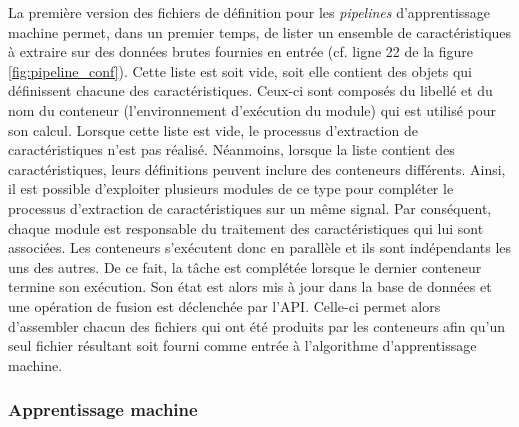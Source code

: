 La première version des fichiers de définition pour les \textit{pipelines} d'apprentissage machine permet, dans un premier temps, de lister un ensemble de caractéristiques à extraire sur des données brutes fournies en entrée (cf. ligne 22 de la figure \ref{fig:pipeline_conf}). Cette liste est soit vide, soit elle contient des objets qui définissent chacune des caractéristiques. Ceux-ci sont composés du libellé et du nom du conteneur (l'environnement d'exécution du module) qui est utilisé pour son calcul. Lorsque cette liste est vide, le processus d'extraction de caractéristiques n'est pas réalisé. Néanmoins, lorsque la liste contient des caractéristiques, leurs définitions peuvent inclure des conteneurs différents. Ainsi, il est possible d'exploiter plusieurs modules de ce type pour compléter le processus d'extraction de caractéristiques sur un même signal. Par conséquent, chaque module est responsable du traitement des caractéristiques qui lui sont associées. Les conteneurs s'exécutent donc en parallèle et ils sont indépendants les uns des autres. De ce fait, la tâche est complétée lorsque le dernier conteneur termine son exécution. Son état est alors mis à jour dans la base de données et une opération de fusion est déclenchée par l'\acs{API}. Celle-ci permet alors d'assembler chacun des fichiers qui ont été produits par les conteneurs afin qu'un seul fichier résultant soit fourni comme entrée à l'algorithme d'apprentissage machine.

\subsubsection{Apprentissage machine}


